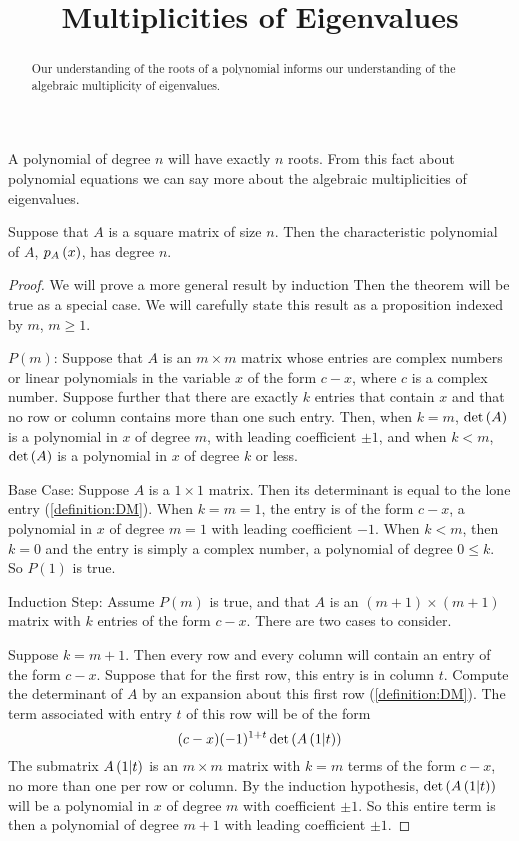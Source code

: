 \documentclass{ximera}
\title{Multiplicities of Eigenvalues}
\begin{document}
\begin{abstract}
  Our understanding of the roots of a polynomial informs our
  understanding of the algebraic multiplicity of eigenvalues.
\end{abstract}
\maketitle

A polynomial of degree $n$ will have exactly $n$ roots.  From this fact about polynomial equations we can say more about the algebraic multiplicities of eigenvalues.

\begin{theorem}
\label{theorem:DCP}

Suppose that $A$ is a square matrix of size $n$.  Then the
characteristic polynomial of $A$, $p_{A}\left(x\right)$, has degree $n$.

\begin{proof}
  We will prove a more general result by induction Then the theorem
  will be true as a special case.  We will carefully state this result
  as a proposition indexed by $m$, $m\geq 1$.

  $P(m)$: Suppose that $A$ is an $m\times m$ matrix whose entries are
  complex numbers or linear polynomials in the variable $x$ of the
  form $c-x$, where $c$ is a complex number.  Suppose further that
  there are exactly $k$ entries that contain $x$ and that no row or
  column contains more than one such entry.  Then, when $k=m$,
  $\det\left(A\right)$ is a polynomial in $x$ of degree $m$, with leading
  coefficient $\pm 1$, and when $k<m$, $\det\left(A\right)$ is a polynomial
  in $x$ of degree $k$ or less.

  Base Case: Suppose $A$ is a $1\times 1$ matrix.  Then its
  determinant is equal to the lone entry (\ref{definition:DM}).  When
  $k=m=1$, the entry is of the form $c-x$, a polynomial in $x$ of
  degree $m=1$ with leading coefficient $-1$.  When $k<m$, then $k=0$
  and the entry is simply a complex number, a polynomial of degree
  $0\leq k$.  So $P(1)$ is true.

  Induction Step: Assume $P(m)$ is true, and that $A$ is an
  $(m+1)\times(m+1)$ matrix with $k$ entries of the form $c-x$.  There
  are two cases to consider.

  Suppose $k=m+1$.  Then every row and every column will contain an
  entry of the form $c-x$.  Suppose that for the first row, this entry
  is in column $t$.  Compute the determinant of $A$ by an expansion
  about this first row (\ref{definition:DM}).  The term associated
  with entry $t$ of this row will be of the form
  \[
    (c-x)(-1)^{1+t}\det\left(A\left(1|t\right)\right)
  \]
  The submatrix $A\left(1|t\right)$ is an $m\times m$ matrix with
  $k=m$ terms of the form $c-x$, no more than one per row or column.
  By the induction hypothesis, $\det\left(A\left(1|t\right)\right)$ will be
  a polynomial in $x$ of degree $m$ with coefficient $\pm 1$.  So this
  entire term is then a polynomial of degree $m+1$ with leading
  coefficient $\pm 1$.


\end{proof}
\end{theorem}
\end{document}

